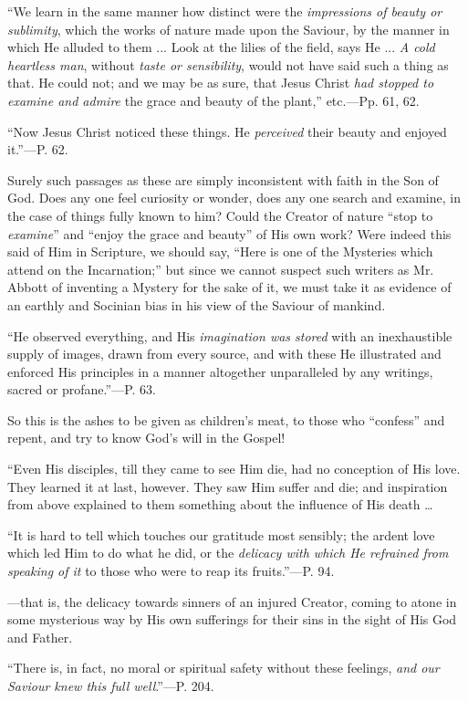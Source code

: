``We learn in the
same manner how distinct were the \emph{impressions of beauty or
sublimity}, which the works of nature made upon the Saviour, by the
manner in which He alluded to them ... Look at the lilies of the
field, says He ... \emph{A cold heartless man}, without \emph{taste or
sensibility}, would not have said such a thing as that. He could
not; and we may be as sure, that Jesus Christ \emph{had stopped to
examine and admire} the grace and beauty of the plant,''
etc.—Pp. 61, 62.

``Now Jesus
Christ noticed these things. He \emph{perceived} their beauty and
enjoyed it.''—P. 62.

Surely such passages as these are simply
inconsistent with faith in the Son of God. Does any one feel curiosity
or wonder, does any one search and examine, in the case of things
fully known to him? Could the Creator of nature ``stop to \emph{examine}''
and ``enjoy the grace and beauty'' of His own work? Were indeed this
said of Him in Scripture, we should say, ``Here is one of the
Mysteries which attend on the Incarnation;'' but since we cannot
suspect such writers as Mr. Abbott of inventing a Mystery for the sake
of it, we must take it as evidence of an earthly and Socinian bias in
his view of the Saviour of mankind.

``He observed
everything, and His \emph{imagination was stored} with an
inexhaustible supply of images, drawn from every source, and with
these He illustrated and enforced His principles in a manner
altogether unparalleled by any writings, sacred or profane.''—P.
63.

So this is the ashes to be given as children's
meat, to those who ``confess'' and repent, and try to know God's
will in the Gospel!

``Even His
disciples, till they came to see Him die, had no conception of His
love. They learned it at last, however. They saw Him suffer and die;
and inspiration from above explained to them something about the
influence of His death …

``It is hard to
tell which touches our gratitude most sensibly; the
ardent love which led Him to do what he did, or the \emph{delicacy with
which He refrained from speaking of it} to those who were to reap
its fruits.''—P. 94.

—that is, the delicacy towards sinners of an
injured Creator, coming to atone in some mysterious way by His own
sufferings for their sins in the sight of His God and Father.

``There is, in
fact, no moral or spiritual safety without these feelings, \emph{and our
Saviour knew this full well}.''—P. 204.

